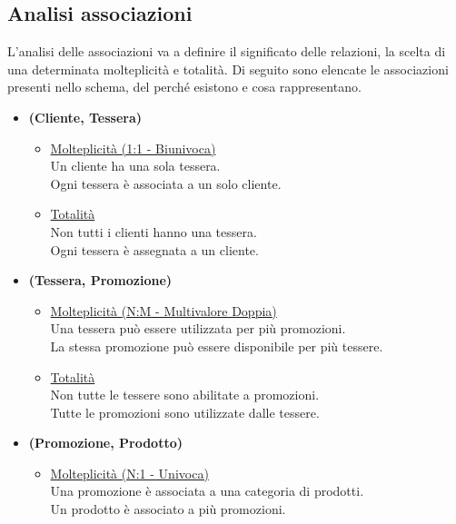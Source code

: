 \documentclass[12pt]{report}
\begin{document}


\subsection{Analisi associazioni}
L’analisi delle associazioni va a definire il significato delle relazioni, la scelta di una determinata molteplicità e totalità. Di seguito sono elencate le associazioni presenti nello schema, del perché esistono e cosa rappresentano.

\begin{itemize}
\item \textbf{(Cliente, Tessera)}
	\begin{itemize}
		\item \underline{Molteplicità (1:1 - Biunivoca)}  \\ [2mm]
			Un cliente ha una sola tessera. \\ 
			Ogni tessera è associata a un solo cliente. \\
		\item \underline{Totalità} \\ [2mm]
		        Non tutti i clienti hanno una tessera.\\
                Ogni tessera è assegnata a un cliente.

	\end{itemize}
\item \textbf{(Tessera, Promozione) }
	\begin{itemize}
		\item \underline{Molteplicità (N:M - Multivalore Doppia) } \\ [2mm]
			Una tessera può essere utilizzata per più promozioni. \\ 
			La stessa promozione può essere disponibile per più tessere. \\
		\item \underline{Totalità} \\ [2mm]
			Non tutte le tessere sono abilitate a promozioni. \\ 
		Tutte le promozioni sono utilizzate dalle tessere.
	\end{itemize}

\newpage

\item \textbf{(Promozione, Prodotto)} 
	\begin{itemize}
		\item \underline{Molteplicità (N:1 - Univoca)} \\ [2mm]
		   	Una promozione è associata a una categoria di prodotti.\\
             Un prodotto è associato a più promozioni.\\


\end{itemize}
\end{itemize}
\end{document}
